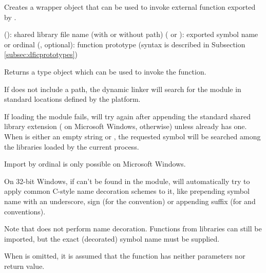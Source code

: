 \documentclass[a4paper,12pt,twoside,extrafontsizes]{memoir}
\begin{document}
\begin{funcdescr}
	Creates a wrapper object that can be used to invoke external function exported by .
\end{funcdescr}

\begin{funcparams}
	 (): shared library file name (with or without path)
	 ( or ): exported symbol name or ordinal
	 (, optional): function prototype (syntax is described in Subsection \ref{subsec:dficprototypes})
\end{funcparams}

\begin{funcret}
	Returns a  type object which can be used to invoke the function.
\end{funcret}

\begin{funcremarks}
	If  does not include a path, the dynamic linker will search for the module in standard locations defined by the platform.
	
	If loading the module fails,  will try again after appending the standard shared library extension ( on Microsoft Windows,  otherwise) unless  already has one. When  is either an empty string or , the requested symbol will be searched among the libraries loaded by the current process.
	
	Import by ordinal is only possible on Microsoft Windows.
	
	On 32-bit Windows, if  can't be found in the module,  will automatically try to apply common C-style name decoration schemes to it, like prepending symbol name with an underscore,  sign (for the  convention) or appending  suffix (for  and  conventions).
	
	Note that  does not perform \cplusplus{} name decoration. Functions from \cplusplus{} libraries can still be imported, but the exact (decorated) symbol name must be supplied.
	
	When  is omitted, it is assumed that the function has neither parameters nor return value.
\end{funcremarks}

\end{document}
